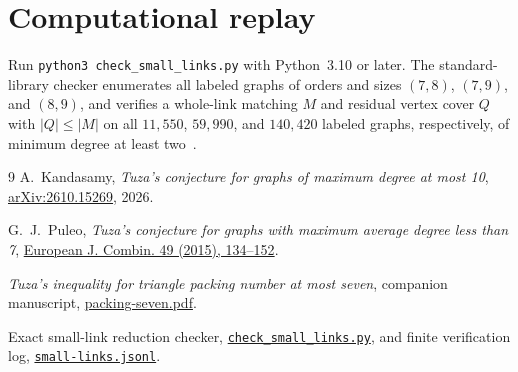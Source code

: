 \documentclass[11pt]{article}
\begin{document}
\section{Computational replay}

Run \texttt{python3 check\_small\_links.py} with Python~3.10 or later. The standard-library checker enumerates all labeled graphs of orders and sizes $(7,8)$, $(7,9)$, and $(8,9)$, and verifies a whole-link matching $M$ and residual vertex cover $Q$ with $|Q|\leq |M|$ on all $11{,}550$, $59{,}990$, and $140{,}420$ labeled graphs, respectively, of minimum degree at least two~\cite{SmallLinks}.

\begin{thebibliography}{9}
A.~Kandasamy, \emph{Tuza's conjecture for graphs of maximum degree at most 10},
\href{https://arxiv.org/abs/2610.15269}{arXiv:2610.15269}, 2026.

G.~J.~Puleo, \emph{Tuza's conjecture for graphs with maximum average degree less than 7},
\href{https://doi.org/10.1016/j.ejc.2015.03.006}{European J. Combin. 49 (2015), 134--152}.

\emph{Tuza's inequality for triangle packing number at most seven}, companion manuscript,
\href{run:packing-seven.pdf}{packing-seven.pdf}.

Exact small-link reduction checker,
\href{https://github.com/claude-make-no-mistakes/tuza-counterexample-search/blob/main/check_small_links.py}{\texttt{check\_small\_links.py}}, and finite verification log,
\href{https://github.com/claude-make-no-mistakes/tuza-counterexample-search/blob/main/small-links.jsonl}{\texttt{small-links.jsonl}}.
\end{thebibliography}
\end{document}
